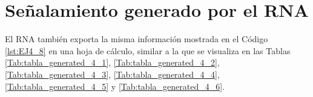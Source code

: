 \section{Señalamiento generado por el RNA}

    El RNA también exporta la misma información mostrada en el Código \ref{lst:EJ4_8} en una hoja de cálculo, similar a la que se visualiza en las Tablas \ref{Tab:tabla_generated_4_1}, \ref{Tab:tabla_generated_4_2}, \ref{Tab:tabla_generated_4_3}, \ref{Tab:tabla_generated_4_4}, \ref{Tab:tabla_generated_4_5} y \ref{Tab:tabla_generated_4_6}.

    \begin{table}[H]
        {
        \caption{Tabla de enclavamiento del ejemplo 4 generada por el RNA (Rutas 1 a 15).}
        \label{Tab:tabla_generated_4_1}
        \begin{center}
\end{center}}
\end{table}
